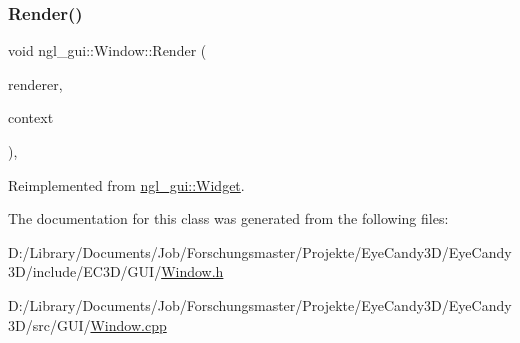 \subsubsection{\texorpdfstring{Render()}{Render()}}
{\footnotesize\ttfamily void ngl\+\_\+gui\+::\+Window\+::\+Render (\begin{DoxyParamCaption}\item[{\mbox{\hyperlink{classngl__gui_1_1_g_u_i_renderer}{G\+U\+I\+Renderer}} \&}]{renderer,  }\item[{\mbox{\hyperlink{classngl__gui_1_1_g_u_i_rendering_context}{G\+U\+I\+Rendering\+Context}} \&}]{context }\end{DoxyParamCaption})\hspace{0.3cm}{\ttfamily [override]}, {\ttfamily [virtual]}}



Reimplemented from \mbox{\hyperlink{classngl__gui_1_1_widget_ac62483b01680572a40125f9208a86392}{ngl\+\_\+gui\+::\+Widget}}.



The documentation for this class was generated from the following files\+:\begin{DoxyCompactItemize}
\item 
D\+:/\+Library/\+Documents/\+Job/\+Forschungsmaster/\+Projekte/\+Eye\+Candy3\+D/\+Eye\+Candy3\+D/include/\+E\+C3\+D/\+G\+U\+I/\mbox{\hyperlink{_g_u_i_2_window_8h}{Window.\+h}}\item 
D\+:/\+Library/\+Documents/\+Job/\+Forschungsmaster/\+Projekte/\+Eye\+Candy3\+D/\+Eye\+Candy3\+D/src/\+G\+U\+I/\mbox{\hyperlink{_g_u_i_2_window_8cpp}{Window.\+cpp}}\end{DoxyCompactItemize}
